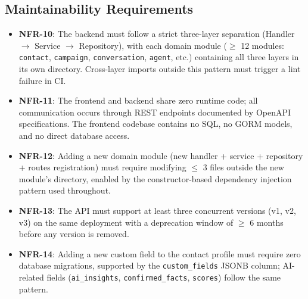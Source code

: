 \documentclass[a4paper]{article}
\begin{document}
\subsection{Maintainability Requirements}
\begin{itemize}
    \item \textbf{NFR-10}: The backend must follow a strict
    three-layer separation (Handler $\to$ Service $\to$
    Repository), with each domain module ($\geq$ 12 modules:
    \texttt{contact}, \texttt{campaign}, \texttt{conversation},
    \texttt{agent}, etc.) containing all three layers in its own
    directory. Cross-layer imports outside this pattern must
    trigger a lint failure in CI.
    \item \textbf{NFR-11}: The frontend and backend share zero
    runtime code; all communication occurs through REST endpoints
    documented by OpenAPI specifications. The frontend codebase
    contains no SQL, no GORM models, and no direct database
    access.
    \item \textbf{NFR-12}: Adding a new domain module (new
    handler + service + repository + routes registration) must
    require modifying $\leq$ 3 files outside the new module's
    directory, enabled by the constructor-based dependency
    injection pattern used throughout.
    \item \textbf{NFR-13}: The API must support at least three
    concurrent versions (v1, v2, v3) on the same deployment with
    a deprecation window of $\geq$ 6 months before any version
    is removed.
    \item \textbf{NFR-14}: Adding a new custom field to the
    contact profile must require zero database migrations,
    supported by the \texttt{custom\_fields} JSONB column;
    AI-related fields (\texttt{ai\_insights},
    \texttt{confirmed\_facts}, \texttt{scores}) follow the same
    pattern.
\end{itemize}
\end{document}
